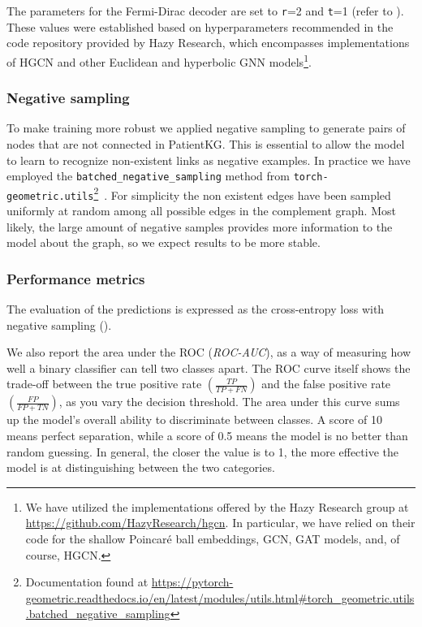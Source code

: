 The parameters for the Fermi-Dirac decoder are set to \texttt{r}=2 and \texttt{t}=1 (refer to ). These values were established based on hyperparameters recommended in the code repository provided by Hazy Research, which encompasses implementations of HGCN and other Euclidean and hyperbolic GNN models\footnote{We have utilized the implementations offered by the Hazy Research group at \url{https://github.com/HazyResearch/hgcn}. In particular, we have relied on their code for the shallow Poincaré ball embeddings, GCN, GAT models, and, of course, HGCN.}. 

\subsubsection{Negative sampling}
To make training more robust we applied negative sampling to generate pairs of nodes that are not connected in PatientKG. This is essential to allow the model to learn to recognize non-existent links as negative examples. In practice we have employed the \texttt{batched\_negative\_sampling} method from \texttt{torch-geometric.utils}\footnote{Documentation found at \url{https://pytorch-geometric.readthedocs.io/en/latest/modules/utils.html\#torch\_geometric.utils.batched\_negative\_sampling}}~\cite{fey2019pytorchGeometric}. For simplicity the non existent edges have been sampled uniformly at random among all possible edges in the complement graph. Most likely, the large amount of negative samples provides more information to the model about the graph, so we expect results to be more stable.

\subsubsection{Performance metrics}\label{sec:performanceMetrics}
The evaluation of the predictions is expressed as the cross-entropy loss with negative sampling (). 

We also report the area under the ROC (\emph{ROC-AUC}), as a way of measuring how well a binary classifier can tell two classes apart. The ROC curve itself shows the trade-off between the true positive rate $\left(\frac{TP}{TP+FN}\right)$ and the false positive rate $\left(\frac{FP}{FP+TN}\right)$, as you vary the decision threshold. The area under this curve sums up the model's overall ability to discriminate between classes. A score of 10 means perfect separation, while a score of 0.5 means the model is no better than random guessing. In general, the closer the value is to 1, the more effective the model is at distinguishing between the two categories.

